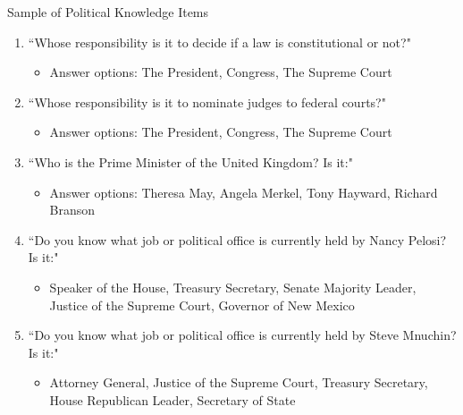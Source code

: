 \documentclass[10pt,table]{beamer}
\begin{document}
\begin{frame}[t, fragile, label = pk_wording]{Sample of Political Knowledge Items}

\setlength{\leftmargini}{15pt}
\setlength{\rightmargini}{20pt}
\vspace{0.5em} \small


\small
    \begin{enumerate}
        \item ``Whose responsibility is it to decide if a law is constitutional or not?" \vspace{0.25em}
        \begin{itemize} \footnotesize
            \item Answer options: The President, Congress, The Supreme Court \vspace{0.5em}
        \end{itemize}
        \item ``Whose responsibility is it to nominate judges to federal courts?" \vspace{0.25em}
         \begin{itemize} \footnotesize
            \item Answer options: The President, Congress, The Supreme Court \vspace{0.5em}
        \end{itemize}
        \item ``Who is the Prime Minister of the United Kingdom? Is it:" \vspace{0.25em}
        \begin{itemize} \footnotesize
            \item Answer options: Theresa May, Angela Merkel, Tony Hayward, Richard Branson \vspace{0.5em}
        \end{itemize}
        \item ``Do you know what job or political office is currently held by Nancy Pelosi? Is it:" \vspace{0.25em}
        \begin{itemize} \footnotesize
            \item Speaker of the House, Treasury Secretary, Senate Majority Leader, Justice of the Supreme Court, Governor of New Mexico \vspace{0.5em}
        \end{itemize}
        \item ``Do you know what job or political office is currently held by Steve Mnuchin? Is it:" \vspace{0.25em}
                \begin{itemize} \footnotesize
            \item Attorney General, Justice of the Supreme Court, Treasury Secretary, House Republican Leader, Secretary of State \vspace{0.5em}
        \end{itemize}
    \end{enumerate}


\end{frame}
\end{document}
